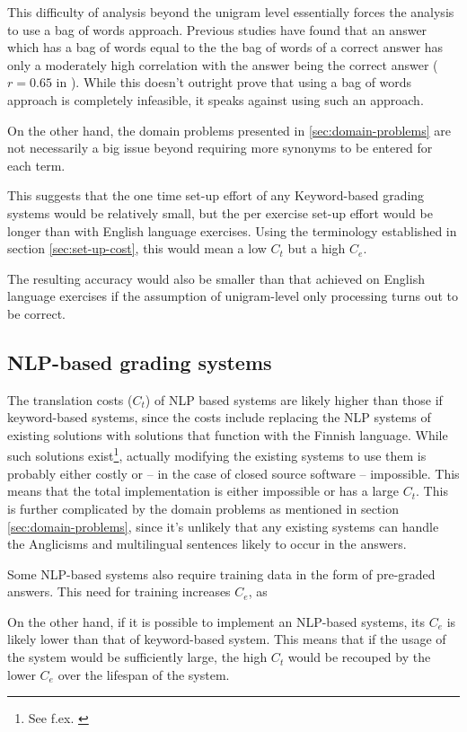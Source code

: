 \documentclass[english]{tktltiki2}
\theoremstyle{definition}
\theoremstyle{remark}
\begin{document}
This difficulty of analysis beyond the unigram level essentially forces the analysis to use a bag of words approach. Previous studies have found that an answer which has a bag of words equal to the the bag of words of a correct answer has only a moderately high correlation with the answer being the correct answer ($r = 0.65$ in \cite{shermis15}). While this doesn't outright prove that using a bag of words approach is completely infeasible, it speaks against using such an approach.

On the other hand, the domain problems presented in \ref{sec:domain-problems} are not necessarily a big issue beyond requiring more synonyms to be entered for each term.

This suggests that the one time set-up effort of any Keyword-based grading systems would be relatively small, but the per exercise set-up effort would be longer than with English language exercises. Using the terminology established in section \ref{sec:set-up-cost}, this would mean a low $C_t$ but a high $C_e$.

The resulting accuracy would also be smaller than that achieved on English language exercises if the assumption of unigram-level only processing turns out to be correct.

\subsection{NLP-based grading systems}

The translation costs ($C_t$) of NLP based systems are likely higher than those if keyword-based systems, since the costs include replacing the NLP systems of existing solutions with solutions that function with the Finnish language. While such solutions exist\footnote{See f.ex. \cite{linden11, pirinen11, linden13}}, actually modifying the existing systems to use them is probably either costly or -- in the case of closed source software -- impossible. This means that the total implementation is either impossible or has a large $C_t$. This is further complicated by the domain problems as mentioned in section \ref{sec:domain-problems}, since it's unlikely that any existing systems can handle the Anglicisms and multilingual sentences likely to occur in the answers.

Some NLP-based systems also require training data in the form of pre-graded answers. This need for training increases $C_e$, as 

On the other hand, if it is possible to implement an NLP-based systems, its $C_e$ is likely lower than that of keyword-based system. This means that if the usage of the system would be sufficiently large, the high $C_t$ would be recouped by the lower $C_e$ over the lifespan of the system.
\end{document}
